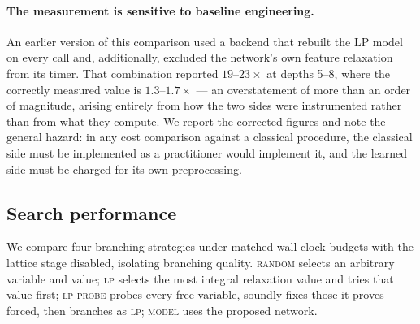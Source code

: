\documentclass[11pt]{article}
\begin{document}
\paragraph{The measurement is sensitive to baseline engineering.} An earlier version of this comparison used a backend that rebuilt the LP model on every call and, additionally, excluded the network's own feature relaxation from its timer. That combination reported $19$--$23\times$ at depths 5--8, where the correctly measured value is $1.3$--$1.7\times$ --- an overstatement of more than an order of magnitude, arising entirely from how the two sides were instrumented rather than from what they compute. We report the corrected figures and note the general hazard: in any cost comparison against a classical procedure, the classical side must be implemented as a practitioner would implement it, and the learned side must be charged for its own preprocessing.

\subsection{Search performance}
\label{sec:exp-search}

We compare four branching strategies under matched wall-clock budgets with the lattice stage disabled, isolating branching quality. \textsc{random} selects an arbitrary variable and value; \textsc{lp} selects the most integral relaxation value and tries that value first; \textsc{lp-probe} probes every free variable, soundly fixes those it proves forced, then branches as \textsc{lp}; \textsc{model} uses the proposed network.
\end{document}
